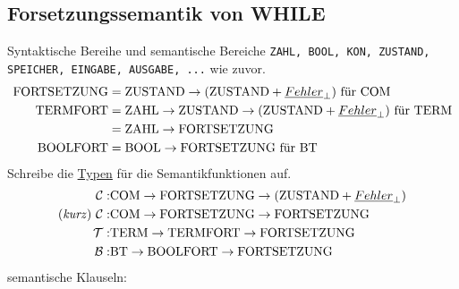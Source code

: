 \subsection{Forsetzungssemantik von WHILE}
Syntaktische Bereihe und semantische Bereiche \lstinline!ZAHL, BOOL, KON, ZUSTAND, SPEICHER, EINGABE, AUSGABE, ...! wie zuvor.\\
\begin{align*}
\text{\lstinline!FORTSETZUNG!} &= \text{\lstinline!ZUSTAND!} \rightarrow (\text{\lstinline!ZUSTAND!} + {\underline{Fehler}_\perp}) \text{ für } \text{\lstinline!COM!}\\
\text{\lstinline!TERMFORT!} &= \text{\lstinline!ZAHL!} \rightarrow \text{\lstinline!ZUSTAND!} \rightarrow (\text{\lstinline!ZUSTAND!} + {\underline{Fehler}_\perp}) \text{ für } \text{\lstinline!TERM!}\\
&= \text{\lstinline!ZAHL!} \rightarrow \text{\lstinline!FORTSETZUNG!}\\
\text{\lstinline!BOOLFORT!} &= \text{\lstinline!BOOL!} \rightarrow \text{\lstinline!FORTSETZUNG!} \text{ für } \text{\lstinline!BT!}\\
\end{align*}
Schreibe die \underline{Typen} für die Semantikfunktionen auf.
\begin{align*}
\mathcal{C}: & \text{\lstinline!COM!} \rightarrow \text{\lstinline!FORTSETZUNG!} \rightarrow (\text{\lstinline!ZUSTAND!} + {\underline{Fehler}_\perp}) \\
\text{(\emph{kurz})}\ \mathcal{C}: & \text{\lstinline!COM!} \rightarrow \text{\lstinline!FORTSETZUNG!} \rightarrow \text{\lstinline!FORTSETZUNG!} \\
\mathcal{T}: & \text{\lstinline!TERM!} \rightarrow \text{\lstinline!TERMFORT!} \rightarrow \text{\lstinline!FORTSETZUNG!}\\
\mathcal{B}: & \text{\lstinline!BT!} \rightarrow \text{\lstinline!BOOLFORT!} \rightarrow \text{\lstinline!FORTSETZUNG!}\\
\end{align*}
semantische Klauseln:
